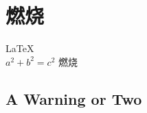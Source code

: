 \documentclass[UTF8]{article}
\begin{document}
       
 
\section{燃烧}          
\LaTeX \,\\ 
 $a^2+b^2=c^2$
 燃烧
\subsection{A Warning or Two}  

\end{document}
